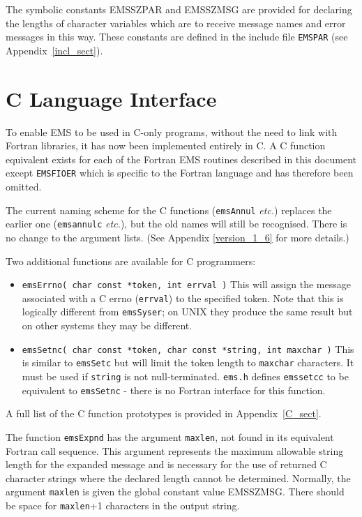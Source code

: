 \documentclass[twoside,11pt]{article}
\newcommand{\htmlref}[2]{#1}
\newcommand{\latex}[1]{#1}
\newcommand{\xlabel}[1]{}
\renewcommand{\_}{\texttt{\symbol{95}}}
\begin{document}
The symbolic constants EMS\_\_SZPAR and EMS\_\_SZMSG are provided for declaring
the lengths of character variables which are to receive message names and 
error messages in this way.
These constants are defined in the include file 
\htmlref{\texttt{EMS\_PAR}}{incl_sect}\latex{ (see
Appendix~\ref{incl_sect})}.

\section{\xlabel{c_language_interface}C Language Interface}
\label{C_lang}
To enable EMS to be used in C-only programs, without the need to link with
Fortran libraries, it has now been implemented entirely
in C. A C function equivalent exists for each of the Fortran EMS routines
described in this document except \texttt{EMS\_FIOER} which is specific to the
Fortran language and has therefore been omitted.

The current naming scheme for the C functions (\texttt{emsAnnul}
\textit{etc.}) replaces the earlier one (\texttt{ems\_annul\_c} \textit{etc.}),
but the old names will still be recognised. 
There is no change to the argument lists.
(See Appendix \ref{version_1_6} for more details.)

Two additional functions are available for C programmers:
\begin{itemize}
\item \texttt{emsErrno( char const *token, int errval )}
This will assign the message associated
with a C errno (\texttt{errval}) to the specified token. Note that this is
logically different from \texttt{emsSyser}; on UNIX they produce the same
result but on other systems they may be different.
\item \texttt{emsSetnc( char const *token, char const *string, int maxchar )} 
This is similar to \texttt{emsSetc} but will limit the token length to
\texttt{maxchar} characters.
It must be used if \texttt{string} is not null-terminated.
\texttt{ems.h} defines \texttt{ems\_setc\_c} to be equivalent to
\texttt{emsSetnc} - there is no Fortran interface for this function.
\end{itemize} 
A full list of the C function prototypes is provided in Appendix~\ref{C_sect}.

The function \texttt{emsExpnd} has the argument \texttt{maxlen}, not found in
its equivalent Fortran call sequence.
This argument represents the maximum allowable string length for the expanded
message and is necessary for the use of returned C character strings where the
declared length cannot be determined.
Normally, the argument \texttt{maxlen} is given the global constant value
EMS\_\_SZMSG. There should be space for \texttt{maxlen}+1 characters in the
output string.
\end{document}

